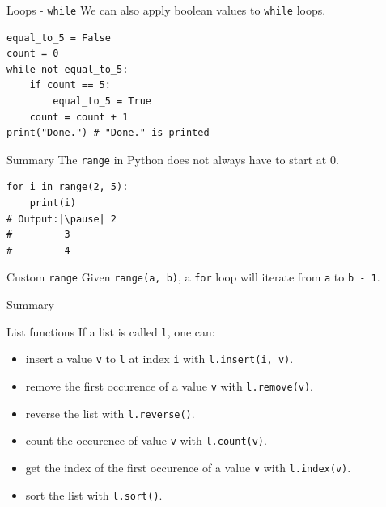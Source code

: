 \documentclass[dvipsnames, svgnames, x11names]{beamer}
\begin{document}
\begin{frame}[fragile]{Loops - \texttt{while}}
We can also apply boolean values to \texttt{while} loops.
\begin{verbatim}
equal_to_5 = False
count = 0
while not equal_to_5:
    if count == 5:
        equal_to_5 = True
    count = count + 1
print("Done.") # "Done." is printed
\end{verbatim}
\end{frame}

\begin{frame}[fragile]{Summary}
The \texttt{range} in Python does not always have to start at 0.
\begin{verbatim}
for i in range(2, 5):
    print(i)
# Output:|\pause| 2
#         3
#         4
\end{verbatim}
\begin{block}{Custom \texttt{range}}
Given \texttt{range(a, b)}, a \texttt{for} loop will iterate from \texttt{a} to \texttt{b - 1}.
\end{block}
\end{frame}

\begin{frame}[fragile]{Summary}
\begin{block}{List functions}
If a list is called \texttt{l}, one can:
\begin{itemize}
    \item insert a value \texttt{v} to \texttt{l} at index \texttt{i} with \texttt{l.insert(i, v)}.
    \item remove the first occurence of a value \texttt{v} with \texttt{l.remove(v)}.
    \item reverse the list with \texttt{l.reverse()}.
    \item count the occurence of value \texttt{v} with \texttt{l.count(v)}.
    \item get the index of the first occurence of a value \texttt{v} with \texttt{l.index(v)}.
    \item sort the list with \texttt{l.sort()}.
\end{itemize}
\end{block}

\end{frame}
\end{document}
